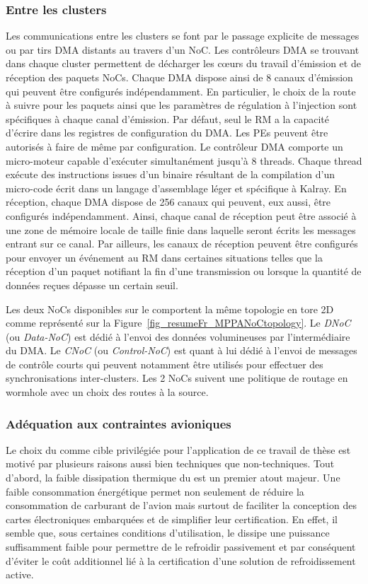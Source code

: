 \documentclass[main.tex]{subfiles}
\begin{document}
\subsubsection{Entre les clusters}
Les communications entre les clusters se font par le passage explicite de messages ou par tirs DMA distants au travers d'un NoC. Les contrôleurs DMA se trouvant dans chaque cluster permettent de décharger les c\oe{}urs du travail d'émission et de réception des paquets NoCs. Chaque DMA dispose ainsi de 8 canaux d'émission qui peuvent être configurés indépendamment. En particulier, le choix de la route à suivre pour les paquets ainsi que les paramètres de régulation à l'injection sont spécifiques à chaque canal d'émission. Par défaut, seul le RM a la capacité d'écrire dans les registres de configuration du DMA. Les PEs peuvent être autorisés à faire de même par configuration. Le contrôleur DMA comporte un micro-moteur capable d'exécuter simultanément jusqu'à 8 threads. Chaque thread exécute des instructions issues d'un binaire résultant de la compilation d'un micro-code écrit dans un langage d'assemblage léger et spécifique à Kalray. En réception, chaque DMA dispose de 256 canaux qui peuvent, eux aussi, être configurés indépendamment. Ainsi, chaque canal de réception peut être associé à une zone de mémoire locale de taille finie dans laquelle seront écrits les messages entrant sur ce canal. Par ailleurs, les canaux de réception peuvent être configurés pour envoyer un événement au RM dans certaines situations telles que la réception d'un paquet notifiant la fin d'une transmission ou lorsque la quantité de données reçues dépasse un certain seuil.

Les deux NoCs disponibles sur le \mppalong comportent la même topologie en tore 2D comme représenté sur la Figure~\ref{fig_resumeFr_MPPANoCtopology}. Le \emph{DNoC} (ou \emph{Data-NoC}) est dédié à l'envoi des données volumineuses par l'intermédiaire du DMA. Le \emph{CNoC} (ou \emph{Control-NoC}) est quant à lui dédié à l'envoi de messages de contrôle courts qui peuvent notamment être utilisés pour effectuer des synchronisations inter-clusters. Les 2 NoCs suivent une politique de routage en wormhole avec un choix des routes à la source.


\subsubsection{Adéquation aux contraintes avioniques}
Le choix du \mppalong comme cible privilégiée pour l'application de ce travail de thèse est motivé par plusieurs raisons aussi bien techniques que non-techniques. Tout d'abord, la faible dissipation thermique du \mppalong est un premier atout majeur. Une faible consommation énergétique permet non seulement de réduire la consommation de carburant de l'avion mais surtout de faciliter la conception des cartes électroniques embarquées et de simplifier leur certification. En effet, il semble que, sous certaines conditions d'utilisation, le \mppalong dissipe une puissance suffisamment faible pour permettre de le refroidir passivement et par conséquent d'éviter le coût additionnel lié à la certification d'une solution de refroidissement active.
\end{document}
